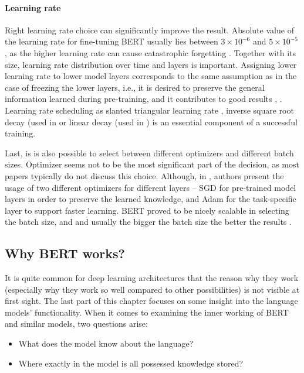 \paragraph{Learning rate} Right learning rate choice can significantly improve the result. Absolute value of the learning rate for fine-tuning BERT usually lies between $3 \times 10^{-6}$ and $5\times 10^{-5}$ \citep{Devlin2019, Virtanen2019}, \citep{Kittask2020} as the higher learning rate can cause catastrophic forgetting \citep{Sun}. Together with its size, learning rate distribution over time and layers is important. Assigning lower learning rate to lower model layers corresponds to the same assumption as in the case of freezing the lower layers, i.e., it is desired to preserve the general information learned during pre-training, and it contributes to good results \citep{Ruder2018, Sun}, \citep{Kondratyuk2019}. Learning rate scheduling as slanted triangular learning rate \citep{Ruder2018}, inverse square root decay (used in \citep{Kondratyuk2019, Raffel2019} or linear decay (used in \citep{Liu2019, Clark2020}) is an essential component of a successful training.
\par
Last, is is also possible to select between different optimizers and different batch sizes. Optimizer seems not to be the most significant part of the decision, as most papers typically do not discuss this choice. Although, in \citep{Chronopoulou2019}, authors present the usage of two different optimizers for different layers -- SGD for pre-trained model layers in order to preserve the learned knowledge, and Adam \citep{Kingma2015} for the task-specific layer to support faster learning. BERT proved to be nicely scalable in selecting the batch size, and and usually the bigger the batch size the better the results \citep{Liu2019}.
\subsection{Why BERT works?}
\label{sub:specialBert}
It is quite common for deep learning architectures that the reason why they work (especially why they work so well compared to other possibilities) is not visible at first sight. The last part of this chapter focuses on some insight into the language models' functionality. When it comes to examining the inner working of BERT and similar models, two questions arise:
\begin{itemize}
\item What does the model know about the language?
\item Where exactly in the model is all possessed knowledge stored?
\end{itemize}

